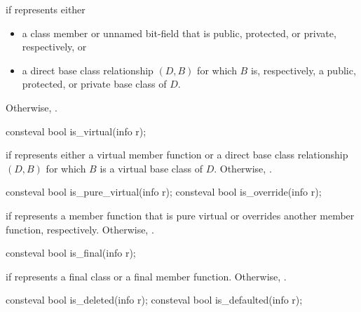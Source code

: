 \begin{itemdescr}
\pnum
\returns
{} if  represents either
\begin{itemize}
\item
  a class member or unnamed bit-field
  that is public, protected, or private, respectively, or
\item
  a direct base class relationship $(D, B)$ for which $B$ is, respectively,
  a public, protected, or private base class of $D$.
\end{itemize}
Otherwise, .
\end{itemdescr}

%
\begin{itemdecl}
consteval bool is_virtual(info r);
\end{itemdecl}

\begin{itemdescr}
\pnum
\returns
{} if  represents either a virtual member function
or a direct base class relationship $(D, B)$
for which $B$ is a virtual base class of $D$.
Otherwise, .
\end{itemdescr}

%
%
\begin{itemdecl}
consteval bool is_pure_virtual(info r);
consteval bool is_override(info r);
\end{itemdecl}

\begin{itemdescr}
\pnum
\returns
{} if  represents a member function that is pure virtual
or overrides another member function, respectively.
Otherwise, .
\end{itemdescr}

%
\begin{itemdecl}
consteval bool is_final(info r);
\end{itemdecl}

\begin{itemdescr}
\pnum
\returns
{} if  represents a final class or a final member function.
Otherwise, .
\end{itemdescr}

%
%
\begin{itemdecl}
consteval bool is_deleted(info r);
consteval bool is_defaulted(info r);
\end{itemdecl}

